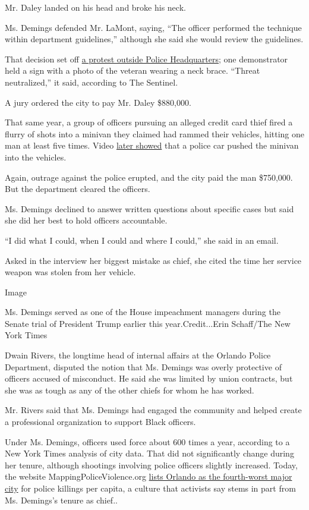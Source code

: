 Mr. Daley landed on his head and broke his neck.

Ms. Demings defended Mr. LaMont, saying, ``The officer performed the
technique within department guidelines,'' although she said she would
review the guidelines.

That decision set off
\href{https://www.orlandosentinel.com/news/os-xpm-2010-10-19-os-orlando-police-protest-20101019-story.html}{a
protest outside Police Headquarters}; one demonstrator held a sign with
a photo of the veteran wearing a neck brace. ``Threat neutralized,'' it
said, according to The Sentinel.

A jury ordered the city to pay Mr. Daley \$880,000.

That same year, a group of officers pursuing an alleged credit card
thief fired a flurry of shots into a minivan they claimed had rammed
their vehicles, hitting one man at least five times. Video
\href{https://www.policeone.com/officer-shootings/articles/video-of-police-shooting-prompts-dismissal-of-charges-uE6LzN6oQCSbzCaa/}{later
showed} that a police car pushed the minivan into the vehicles.

Again, outrage against the police erupted, and the city paid the man
\$750,000. But the department cleared the officers.

Ms. Demings declined to answer written questions about specific cases
but said she did her best to hold officers accountable.

``I did what I could, when I could and where I could,'' she said in an
email.

Asked in the interview her biggest mistake as chief, she cited the time
her service weapon was stolen from her vehicle.

Image

Ms. Demings served as one of the House impeachment managers during the
Senate trial of President Trump earlier this year.Credit...Erin
Schaff/The New York Times

Dwain Rivers, the longtime head of internal affairs at the Orlando
Police Department, disputed the notion that Ms. Demings was overly
protective of officers accused of misconduct. He said she was limited by
union contracts, but she was as tough as any of the other chiefs for
whom he has worked.

Mr. Rivers said that Ms. Demings had engaged the community and helped
create a professional organization to support Black officers.

Under Ms. Demings, officers used force about 600 times a year, according
to a New York Times analysis of city data. That did not significantly
change during her tenure, although shootings involving police officers
slightly increased. Today, the website MappingPoliceViolence.org
\href{https://mappingpoliceviolence.org/cities}{lists Orlando as the
fourth-worst major city} for police killings per capita, a culture that
activists say stems in part from Ms. Demings's tenure as chief..


